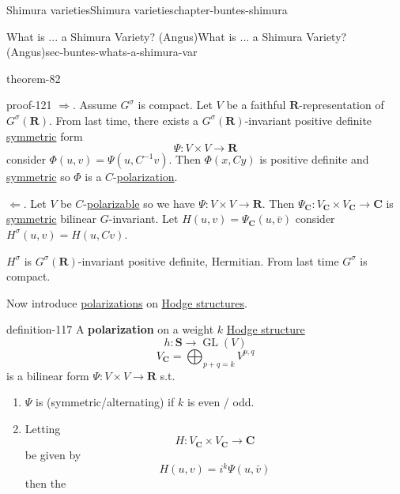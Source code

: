 \documentclass[oneside,10pt,]{book}
\newcommand{\terminology}[1]{\textbf{#1}}
\numberwithin{equation}{section}
\newcommand{\inv}{^{-1}}
\newcommand{\RR}{\mathbf{R}}
\newcommand{\CC}{\mathbf{C}}
\DeclareMathOperator{\GL}{GL}
\begin{document}
\begin{chapterptx}{Shimura varieties}{}{Shimura varieties}{}{}{chapter-buntes-shimura}
\begin{sectionptx}{What is ... a Shimura Variety? (Angus)}{}{What is ... a Shimura Variety? (Angus)}{}{}{sec-buntes-whats-a-shimura-var}
\begin{theorem}{}{}{theorem-82}
\end{theorem}
\begin{proofptx}{}{proof-121}
\hypertarget{p-1223}{}%
\(\Rightarrow\). Assume \(G^\sigma \) is compact. Let \(V\) be a faithful \(\RR\)-representation of \(G^\sigma (\RR)\). From last time, there exists a \(G^\sigma(\RR)\)-invariant positive definite \hyperref[def-princ-pol]{symmetric} form%
\begin{equation*}
\Psi\colon V\times V\to \RR
\end{equation*}
consider \(\Phi(u,v) = \Psi(u, C\inv v)\). Then \(\Phi(x,Cy)\) is positive definite and \hyperref[def-princ-pol]{symmetric} so \(\Phi\) is a \(C\)-\hyperref[def-c-pol]{polarization}.%
\par
\hypertarget{p-1224}{}%
\(\Leftarrow\). Let \(V\) be \(C\)-\hyperref[def-polarizable]{polarizable} so we have \(\Psi \colon V\times V \to  \RR\). Then \(\Psi_\CC \colon V_\CC \times V_\CC \to \CC\) is \hyperref[def-princ-pol]{symmetric} bilinear \(G\)-invariant. Let \(H(u,v) = \Psi_\CC(u,\bar v)\) consider \(H^\sigma(u,v) = H(u,Cv)\).%
\par
\hypertarget{p-1225}{}%
\(H^\sigma\) is \(G^\sigma(\RR)\)-invariant positive definite, Hermitian. From last time \(G^\sigma\) is compact.%
\end{proofptx}
\hypertarget{p-1226}{}%
Now introduce \hyperref[def-c-pol]{polarizations} on \hyperref[def-hodge-str]{Hodge structures}.%
\begin{definition}{}{definition-117}%
\hypertarget{p-1227}{}%
A \terminology{polarization} on a weight \(k\) \hyperref[def-hodge-str]{Hodge structure}%
\begin{equation*}
h\colon \mathbf S \to \GL(V)
\end{equation*}
%
\begin{equation*}
V_\CC = \bigoplus_{p+q = k} V^{p,q}
\end{equation*}
is a bilinear form \(\Psi\colon V\times V \to \RR\) s.t.\leavevmode%
\begin{enumerate}
\item\hypertarget{li-294}{}\(\Psi\) is (symmetric/alternating) if \(k\) is even / odd.%
\item\hypertarget{li-295}{}Letting%
\begin{equation*}
H\colon V_\CC \times V_\CC \to \CC
\end{equation*}
be given by%
\begin{equation*}
H(u,v) = i^k \Psi(u, \bar v)
\end{equation*}
then the%
\begin{equation*}

\end{equation*}
\end{enumerate}
\end{definition}
\end{sectionptx}
\end{chapterptx}
\end{document}
